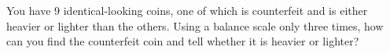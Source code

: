 You have $9$ identical-looking coins, one of which is counterfeit and is either heavier or lighter than the others. Using a balance scale only three times, how can you find the counterfeit coin and tell whether it is heavier or lighter?
